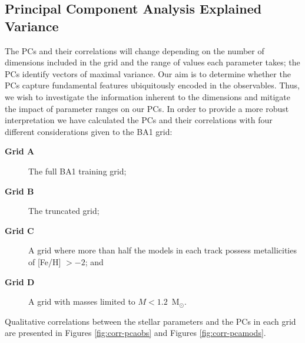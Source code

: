 \subsection{Principal Component Analysis Explained Variance} 
\label{sec:fullPCA}

The PCs and their correlations will change depending on the number of dimensions included in the grid and the range of values each parameter takes; the PCs identify vectors of maximal variance. 
Our aim is to determine whether the PCs capture fundamental features ubiquitously encoded in the observables. 
Thus, we wish to investigate the information inherent to the dimensions and mitigate the impact of parameter ranges on our PCs. 
In order to provide a more robust interpretation we have calculated the PCs and their correlations with four different considerations given to the BA1 grid:
\begin{description}
    \item[\textbf{Grid A}] The full BA1 training grid;
    \item[\textbf{Grid B}] The truncated grid;
    \item[\textbf{Grid C}] A grid where more than half the models in each track possess metallicities of [Fe/H] $> -2$; and
     \item[\textbf{Grid D}] A grid with masses limited to ${M < 1.2}$~M$_{\odot}$.
\end{description}
Qualitative correlations between the stellar parameters and the PCs in each grid are presented in Figures \ref{fig:corr-pcaobs} and Figures \ref{fig:corr-pcamods}.


